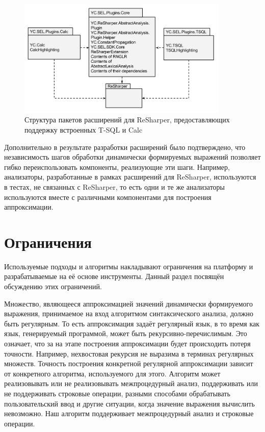 \begin{figure}[H]
  \centering
 \includegraphics[width=0.90\textwidth]{pics/RshPluginsPackages.png}
 \caption{Структура пакетов расширений для ReSharper, предоставляющих поддержку встроенных T-SQL и Calc}
 \label{fig:packagesStructure}
\end{figure}

Дополнительно в результате разработки расширений было подтверждено, что независимость шагов обработки динамически формируемых выражений позволяет гибко переиспользовать компоненты, реализующие эти шаги. Например, анализаторы, разработанные в рамках расширений для ReSharper, используются в тестах, не связанных с ReSharper, то есть одни и те же анализаторы используются вместе с различными компонентами для построения аппроксимации.

\section{Ограничения}

Используемые подходы и алгоритмы накладывают ограничения на платформу и разрабатываемые на её основе инструменты. Данный раздел посвящён обсуждению этих ограничений.

Множество, являющееся аппроксимацией значений динамически формируемого выражения, принимаемое на вход алгоритмом синтаксического анализа, должно быть регулярным. То есть аппроксимация задаёт регулярный язык, в то время как язык, генерируемый программой, может быть рекурсивно-перечислимым. Это означает, что за на этапе построения аппроксимации будет происходить потеря точности. Например, нехвостовая рекурсия не выразима в терминах регулярных множеств. Точность построения конкретной регулярной аппроксимации зависит от конкретного алгоритма, используемого для этого. Алгоритм может реализовывать или не реализовывать межпроцедурный анализ, поддерживать или не поддерживать строковые операции, разными способами обрабатывать пользовательский ввод и другие ситуации, когда значение выражения вычислить невозможно. Наш алгоритм поддерживает межпроцедурный анализ и строковые операции. 


